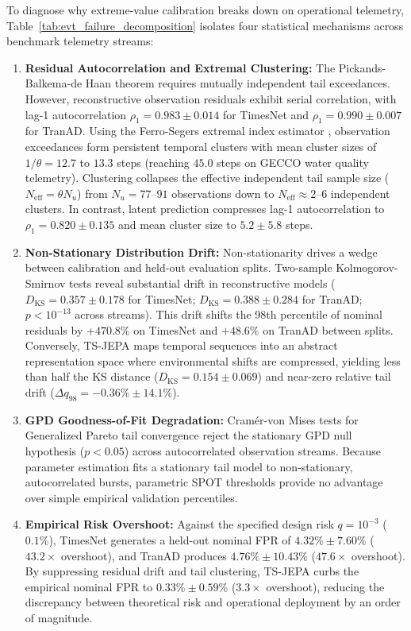 To diagnose why extreme-value calibration breaks down on operational telemetry, Table~\ref{tab:evt_failure_decomposition} isolates four statistical mechanisms across benchmark telemetry streams:
\begin{enumerate}
    \item \textbf{Residual Autocorrelation and Extremal Clustering:} The Pickands-Balkema-de Haan theorem \cite{balkema1974residual} requires mutually independent tail exceedances. However, reconstructive observation residuals exhibit serial correlation, with lag-1 autocorrelation $\rho_1 = 0.983 \pm 0.014$ for TimesNet and $\rho_1 = 0.990 \pm 0.007$ for TranAD. Using the Ferro-Segers extremal index estimator \cite{ferro2003inference}, observation exceedances form persistent temporal clusters with mean cluster sizes of $1/\theta = 12.7$ to $13.3$ steps (reaching $45.0$ steps on GECCO water quality telemetry). Clustering collapses the effective independent tail sample size ($N_{\text{eff}} = \theta N_u$) from $N_u = 77\text{--}91$ observations down to $N_{\text{eff}} \approx 2\text{--}6$ independent clusters. In contrast, latent prediction compresses lag-1 autocorrelation to $\rho_1 = 0.820 \pm 0.135$ and mean cluster size to $5.2 \pm 5.8$ steps.
    \item \textbf{Non-Stationary Distribution Drift:} Non-stationarity drives a wedge between calibration and held-out evaluation splits. Two-sample Kolmogorov-Smirnov tests reveal substantial drift in reconstructive models ($D_{\text{KS}} = 0.357 \pm 0.178$ for TimesNet; $D_{\text{KS}} = 0.388 \pm 0.284$ for TranAD; $p < 10^{-13}$ across streams). This drift shifts the 98th percentile of nominal residuals by $+470.8\%$ on TimesNet and $+48.6\%$ on TranAD between splits. Conversely, TS-JEPA maps temporal sequences into an abstract representation space where environmental shifts are compressed, yielding less than half the KS distance ($D_{\text{KS}} = 0.154 \pm 0.069$) and near-zero relative tail drift ($\Delta q_{98} = -0.36\% \pm 14.1\%$).
    \item \textbf{GPD Goodness-of-Fit Degradation:} Cram{\'e}r-von Mises tests for Generalized Pareto tail convergence reject the stationary GPD null hypothesis ($p < 0.05$) across autocorrelated observation streams. Because parameter estimation fits a stationary tail model to non-stationary, autocorrelated bursts, parametric SPOT thresholds provide no advantage over simple empirical validation percentiles.
    \item \textbf{Empirical Risk Overshoot:} Against the specified design risk $q = 10^{-3}$ ($0.1\%$), TimesNet generates a held-out nominal FPR of $4.32\% \pm 7.60\%$ ($43.2\times$ overshoot), and TranAD produces $4.76\% \pm 10.43\%$ ($47.6\times$ overshoot). By suppressing residual drift and tail clustering, TS-JEPA curbs the empirical nominal FPR to $0.33\% \pm 0.59\%$ ($3.3\times$ overshoot), reducing the discrepancy between theoretical risk and operational deployment by an order of magnitude.
\end{enumerate}

